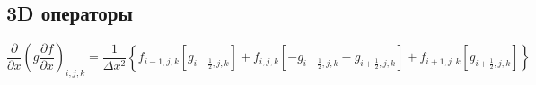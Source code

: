 \documentclass[12pt, a4paper]{article}
\newcommand\onehalf{\frac{1}{2}} %
\begin{document}
\subsection*{3D операторы}

\begin{equation*}
    \left.
        \frac
            {\partial}
            {\partial x}
        \left(
            g
            \frac
                {\partial f}
                {\partial x}
        \right)
    \right._{i, j, k}
    =
    \frac
        {1}
        {\Delta x^2}
    \left\{
        f_{i - 1, j, k}
        \left[
              g_{i - \onehalf, j, k}
        \right]
        +
        f_{i, j, k}
        \left[
            - g_{i - \onehalf, j, k}
            - g_{i + \onehalf, j, k}
        \right]
        +
        f_{i + 1, j, k}
        \left[
              g_{i + \onehalf, j, k}
        \right]
    \right\}
\end{equation*}
\end{document}
